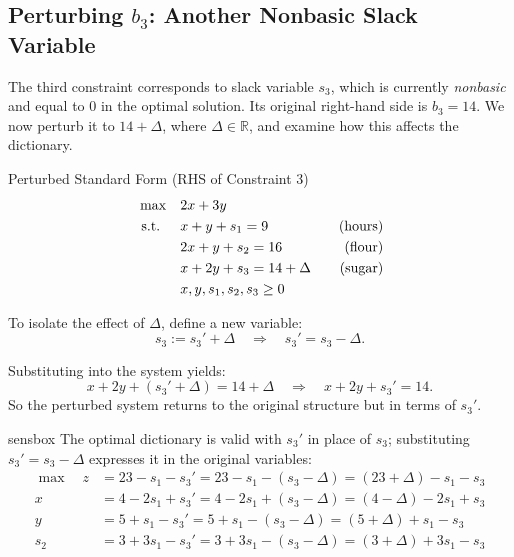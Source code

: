 \subsection{Perturbing \( b_3 \): Another Nonbasic Slack Variable}

The third constraint corresponds to slack variable \( s_3 \), which is currently \emph{nonbasic} and equal to 0 in the optimal solution. Its original right-hand side is \( b_3 = 14 \). We now perturb it to \( 14 + \Delta \), where \( \Delta \in \mathbb{R} \), and examine how this affects the dictionary.

\begin{sensdisplay}{Perturbed Standard Form (RHS of Constraint 3)}
\[
\begin{aligned}
\max \quad & 2x + 3y \\
\mbox{ s.t. } \quad
& x + y + s_1 = 9 \quad & \mbox{(hours)} \\
& 2x + y + s_2 = 16 \quad & \mbox{(flour)} \\
& x + 2y + s_3 = 14 + \Delta \quad & \mbox{(sugar)} \\
& x, y, s_1, s_2, s_3 \geq 0
\end{aligned}
\]

To isolate the effect of \( \Delta \), define a new variable:
\[
s_3 := s_3' + \Delta \quad \Rightarrow \quad s_3' = s_3 - \Delta.
\]

Substituting into the system yields:
\[
x + 2y + (s_3' + \Delta) = 14 + \Delta \quad \Rightarrow \quad x + 2y + s_3' = 14.
\]
So the perturbed system returns to the original structure but in terms of \( s_3' \).
\end{sensdisplay}

\begin{steppanel}{sensbox}
The optimal dictionary is valid with \( s_3' \) in place of \( s_3 \); substituting \( s_3' = s_3 - \Delta \) expresses it in the original variables:
\[
\begin{aligned}
\max \quad
z &= 23 - s_1 - s_3' = 23 - s_1 - (s_3 - \Delta) = (23 + \Delta) - s_1 - s_3 \\
x &= 4 - 2s_1 + s_3' = 4 - 2s_1 + (s_3 - \Delta) = (4 - \Delta) - 2s_1 + s_3 \\
y &= 5 + s_1 - s_3' = 5 + s_1 - (s_3 - \Delta) = (5 + \Delta) + s_1 - s_3 \\
s_2 &= 3 + 3s_1 - s_3' = 3 + 3s_1 - (s_3 - \Delta) = (3 + \Delta) + 3s_1 - s_3
\end{aligned}
\]
\end{steppanel}

